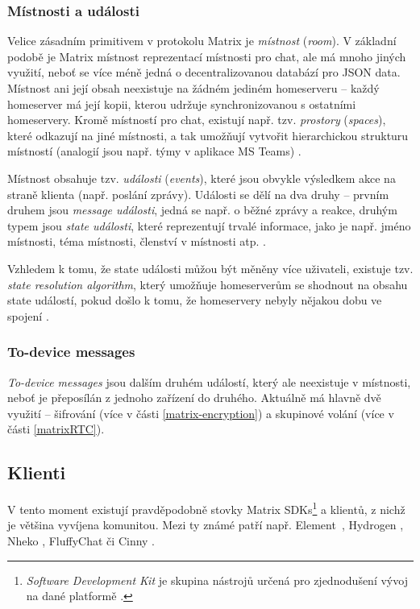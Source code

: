 \subsubsection{Místnosti a události}

Velice zásadním primitivem v protokolu Matrix je \textit{místnost}
(\textit{room}). V základní podobě je Matrix místnost reprezentací místnosti
pro chat, ale má mnoho jiných využití, neboť se více méně jedná o
decentralizovanou databází pro JSON data. Místnost ani její obsah neexistuje na
žádném jediném homeserveru -- každý homeserver má její kopii, kterou udržuje
synchronizovanou s ostatními homeservery. Kromě místností pro chat, existují
např. tzv. \textit{prostory} (\textit{spaces}), které odkazují na jiné
místnosti, a tak umožňují vytvořit hierarchickou strukturu místností (analogií
jsou např. týmy v aplikace MS Teams) \cite{MatrixORG-Spec}.

Místnost obsahuje tzv. \textit{události} (\textit{events}), které jsou obvykle
výsledkem akce na straně klienta (např. poslání zprávy). Události se dělí na dva
druhy -- prvním druhem jsou \textit{message události}, jedná se např. o běžné
zprávy a reakce, druhým typem jsou \textit{state události}, které reprezentují
trvalé informace, jako je např. jméno místnosti, téma místnosti, členství v
místnosti atp. \cite{MatrixORG-Spec}.

Vzhledem k tomu, že state události můžou být měněny více uživateli, existuje tzv.
\textit{state resolution algorithm}, který umožňuje homeserverům se shodnout na
obsahu state událostí, pokud došlo k tomu, že homeservery nebyly nějakou dobu ve
spojení \cite{MatrixORG-Spec}.

\subsubsection{To-device messages}

\textit{To-device messages} jsou dalším druhém událostí, který ale neexistuje v
místnosti, neboť je přeposílán z jednoho zařízení do druhého. Aktuálně má hlavně
dvě využití -- šifrování (více v části \ref{matrix-encryption}) a skupinové
volání (více v části \ref{matrixRTC}).

\subsection{Klienti}

V tento moment existují pravděpodobně stovky Matrix SDKs\footnote{
	\textit{Software Development Kit} je skupina nástrojů určená pro zjednodušení
	vývoj na dané platformě \cite{RedHat-WhatIsAnSDK}.
} a klientů, z nichž je většina vyvíjena komunitou. Mezi ty známé patří např.
Element~\cite{Element-Homepage}, Hydrogen \cite{GitHub-Hydrogen}, Nheko
\cite{GitHub-Nheko}, FluffyChat \cite{FluffyChat-Homepage} či Cinny
\cite{Cinny-Homepage}.

